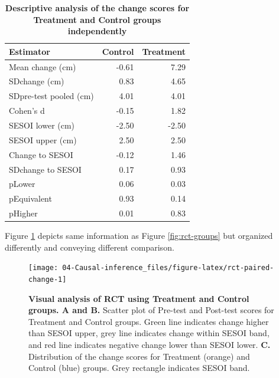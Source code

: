 \documentclass[
]{book}
\begin{document}
\begin{table}

\caption{\label{tab:rct-change}\textbf{Descriptive analysis of the change scores for Treatment and Control groups independently}}
\centering
\begin{tabular}[t]{lrr}
\toprule
Estimator & Control & Treatment\\
\midrule
Mean change (cm) & -0.61 & 7.29\\
SDchange (cm) & 0.83 & 4.65\\
SDpre-test pooled (cm) & 4.01 & 4.01\\
Cohen's d & -0.15 & 1.82\\
SESOI lower (cm) & -2.50 & -2.50\\
\addlinespace
SESOI upper (cm) & 2.50 & 2.50\\
Change to SESOI & -0.12 & 1.46\\
SDchange to SESOI & 0.17 & 0.93\\
pLower & 0.06 & 0.03\\
pEquivalent & 0.93 & 0.14\\
\addlinespace
pHigher & 0.01 & 0.83\\
\bottomrule
\end{tabular}
\end{table}

Figure \ref{fig:rct-paired-change} depicts same information as Figure \ref{fig:rct-groups} but organized differently and conveying different comparison.

\begin{figure}

{\centering \texttt{[image: 04-Causal-inference\_files/figure-latex/rct-paired-change-1]} 

}

\caption{\textbf{Visual analysis of RCT using Treatment and Control groups. A and B. }Scatter plot of Pre-test and Post-test scores for Treatment and Control groups. Green line indicates change higher than SESOI upper, grey line indicates change within SESOI band, and red line indicates negative change lower than SESOI lower. \textbf{C. } Distribution of the change scores for Treatment (orange) and Control (blue) groups. Grey rectangle indicates SESOI band.}\label{fig:rct-paired-change}
\end{figure}
\end{document}
